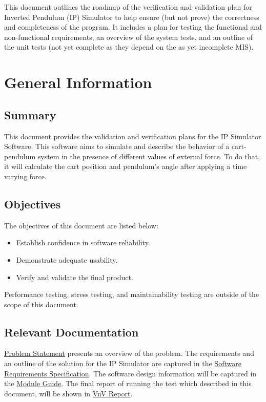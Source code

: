 \documentclass[12pt, titlepage]{article}
\begin{document}

This document outlines the roadmap of the verification and validation plan for Inverted Pendulum (IP) Simulator to help ensure (but not prove) the correctness and completeness of the program.
It includes a plan for testing the functional and non-functional requirements, an overview of the system tests, and an outline of the unit tests (not yet complete as they depend on the as yet incomplete MIS).

\section{General Information}

\subsection{Summary}
This document provides the validation and verification plans for the IP Simulator Software. This software aims to simulate and describe the behavior of a cart-pendulum system in the presence of different values of external force. To do that, it will calculate the cart position and pendulum's angle after applying a time varying force.
\subsection{Objectives}

The objectives of this document are listed below:
\begin{itemize}
\item Establish confidence in software reliability.
\item Demonstrate adequate usability.
\item Verify and validate the final product.
\end{itemize}
Performance testing, stress testing, and maintainability testing are outside of the scope of this document.
\subsection{Relevant Documentation}

\href{https://github.com/MinMah23/CAS741-Project/tree/main/docs/ProblemStatementAndGoals/ProblemStatement.pdf}{Problem Statement} presents an overview of the problem.
The requirements and an outline of the solution for the IP Simulator are captured in the \href{https://github.com/MinMah23/CAS741-Project/tree/main/docs/SRS/SRS.pdf}{Software Requirements Specification}. The software design information will be captured in the \href{https://github.com/MinMah23/CAS741-Project/tree/main/docs/Design}{Module Guide}. The final report of running the test which described in this document, will be shown in \href{https://github.com/Maryamvalian/project741/blob/main/docs/VnVReport/VnVReport.pdf}{VnV Report}.
\end{document}
